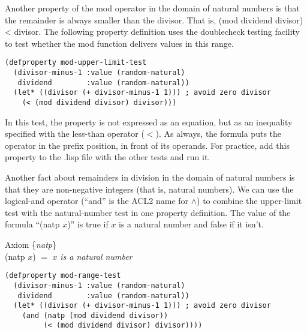 Another property of the mod operator
in the domain of natural numbers
is that the remainder
is always smaller than the divisor.
That is, (mod dividend divisor) < divisor.
The following property definition uses
the doublecheck testing facility
to test whether the mod function delivers values in this range.

\begin{Verbatim}
(defproperty mod-upper-limit-test
  (divisor-minus-1 :value (random-natural)
   dividend        :value (random-natural))
  (let* ((divisor (+ divisor-minus-1 1))) ; avoid zero divisor
    (< (mod dividend divisor) divisor)))
\end{Verbatim}

In this test, the property is not expressed as an equation,
but as an inequality
specified with the less-than operator ($<$).
As always, the formula puts the operator in the prefix position,
in front of its operands.
For practice, add this property to the .lisp file with the other tests and run it.

Another fact about remainders in division in the domain of natural numbers is that
they are non-negative integers (that is, natural numbers).
We can use the logical-and operator (``and'' is the ACL2 name for $\wedge$)
to combine the upper-limit test with the natural-number test
in one property definition.
\label{natp-op}
The value of the formula ``(natp $x$)'' is true
if $x$ is a natural number and false if it isn't.

\label{natp-axiom-formal}
\begin{center}
Axiom \{\emph{natp}\} \\
(natp $x$) $=$ $x$ \emph{is a natural number}
\end{center}

\begin{Verbatim}
(defproperty mod-range-test
  (divisor-minus-1 :value (random-natural)
   dividend        :value (random-natural))
  (let* ((divisor (+ divisor-minus-1 1))) ; avoid zero divisor
    (and (natp (mod dividend divisor))
         (< (mod dividend divisor) divisor))))
\end{Verbatim}

